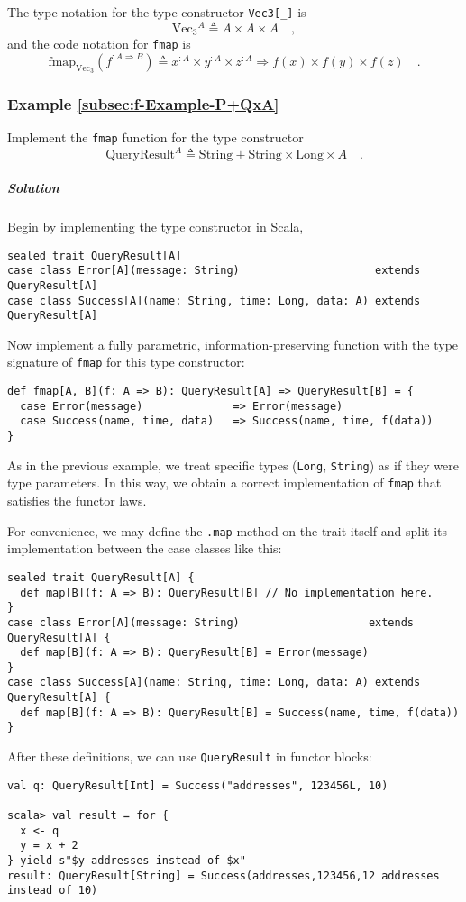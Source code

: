 The type notation for the type constructor \lstinline!Vec3[_]! is
\[
\text{Vec}_{3}{}^{A}\triangleq A\times A\times A\quad,
\]
and the code notation for \lstinline!fmap! is
\[
\text{fmap}_{\text{Vec}_{3}}(f^{:A\Rightarrow B})\triangleq x^{:A}\times y^{:A}\times z^{:A}\Rightarrow f(x)\times f(y)\times f(z)\quad.
\]


\subsubsection{Example \label{subsec:f-Example-P+QxA}\ref{subsec:f-Example-P+QxA}}

Implement the \lstinline!fmap! function for the type constructor
\[
\text{QueryResult}^{A}\triangleq\text{String}+\text{String}\times\text{Long}\times A\quad.
\]


\subparagraph{Solution}

Begin by implementing the type constructor in Scala,
\begin{lstlisting}
sealed trait QueryResult[A]
case class Error[A](message: String)                     extends QueryResult[A]
case class Success[A](name: String, time: Long, data: A) extends QueryResult[A]
\end{lstlisting}
Now implement a fully parametric, information-preserving function
with the type signature of \lstinline!fmap! for this type constructor:
\begin{lstlisting}
def fmap[A, B](f: A => B): QueryResult[A] => QueryResult[B] = {
  case Error(message)              => Error(message)
  case Success(name, time, data)   => Success(name, time, f(data))
}
\end{lstlisting}
As in the previous example, we treat specific types (\lstinline!Long!,
\lstinline!String!) as if they were type parameters. In this way,
we obtain a correct implementation of \lstinline!fmap! that satisfies
the functor laws.

For convenience, we may define the \lstinline!.map! method on the
trait itself and split its implementation between the case classes
like this:
\begin{lstlisting}
sealed trait QueryResult[A] {
  def map[B](f: A => B): QueryResult[B] // No implementation here.
}
case class Error[A](message: String)                    extends QueryResult[A] {
  def map[B](f: A => B): QueryResult[B] = Error(message)
}
case class Success[A](name: String, time: Long, data: A) extends QueryResult[A] {
  def map[B](f: A => B): QueryResult[B] = Success(name, time, f(data))
}
\end{lstlisting}
After these definitions, we can use \lstinline!QueryResult! in functor
blocks:
\begin{lstlisting}
val q: QueryResult[Int] = Success("addresses", 123456L, 10)

scala> val result = for {
  x <- q
  y = x + 2
} yield s"$y addresses instead of $x"
result: QueryResult[String] = Success(addresses,123456,12 addresses instead of 10)
\end{lstlisting}


